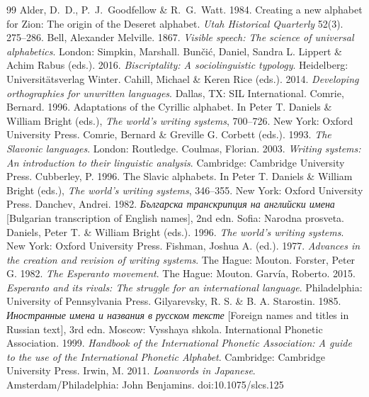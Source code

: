 \documentclass[12pt]{article}
\begin{document}
\begin{thebibliography}{99}
 Alder, D.~D., P.~J.~Goodfellow \& R.~G.~Watt. 1984. Creating a new alphabet for Zion: The origin of the Deseret alphabet. \emph{Utah Historical Quarterly} 52(3). 275--286.
 Bell, Alexander Melville. 1867. \emph{Visible speech: The science of universal alphabetics}. London: Simpkin, Marshall.
 Bun\v{c}i\'c, Daniel, Sandra L. Lippert \& Achim Rabus (eds.). 2016. \emph{Biscriptality: A sociolinguistic typology}. Heidelberg: Universit\"atsverlag Winter.
 Cahill, Michael \& Keren Rice (eds.). 2014. \emph{Developing orthographies for unwritten languages}. Dallas, TX: SIL International.
 Comrie, Bernard. 1996. Adaptations of the Cyrillic alphabet. In Peter T. Daniels \& William Bright (eds.), \emph{The world's writing systems}, 700--726. New York: Oxford University Press.
 Comrie, Bernard \& Greville G. Corbett (eds.). 1993. \emph{The Slavonic languages}. London: Routledge.
 Coulmas, Florian. 2003. \emph{Writing systems: An introduction to their linguistic analysis}. Cambridge: Cambridge University Press.
 Cubberley, P. 1996. The Slavic alphabets. In Peter T. Daniels \& William Bright (eds.), \emph{The world's writing systems}, 346--355. New York: Oxford University Press.
 Danchev, Andrei. 1982. \emph{Българска транскрипция на английски имена} [Bulgarian transcription of English names], 2nd edn. Sofia: Narodna prosveta.
 Daniels, Peter T. \& William Bright (eds.). 1996. \emph{The world's writing systems}. New York: Oxford University Press.
 Fishman, Joshua A. (ed.). 1977. \emph{Advances in the creation and revision of writing systems}. The Hague: Mouton.
 Forster, Peter G. 1982. \emph{The Esperanto movement}. The Hague: Mouton.
 Garv\'ia, Roberto. 2015. \emph{Esperanto and its rivals: The struggle for an international language}. Philadelphia: University of Pennsylvania Press.
 Gilyarevsky, R. S. \& B. A. Starostin. 1985. \emph{Иностранные имена и названия в русском тексте} [Foreign names and titles in Russian text], 3rd edn. Moscow: Vysshaya shkola.
 International Phonetic Association. 1999. \emph{Handbook of the International Phonetic Association: A guide to the use of the International Phonetic Alphabet}. Cambridge: Cambridge University Press.
 Irwin, M. 2011. \emph{Loanwords in Japanese}. Amsterdam/Philadelphia: John Benjamins. doi:10.1075/slcs.125

\end{thebibliography}
\end{document}
